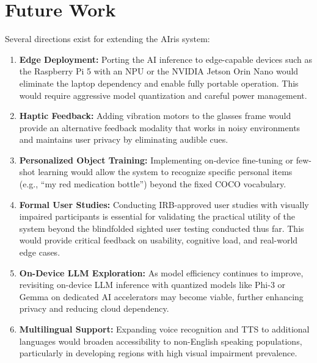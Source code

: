 \documentclass[12pt,a4paper]{report}
\begin{document}
\section{Future Work}

Several directions exist for extending the AIris system:

\begin{enumerate}
    \item \textbf{Edge Deployment:} Porting the AI inference to edge-capable devices such as the Raspberry Pi 5 with an NPU or the NVIDIA Jetson Orin Nano would eliminate the laptop dependency and enable fully portable operation. This would require aggressive model quantization and careful power management.

    \item \textbf{Haptic Feedback:} Adding vibration motors to the glasses frame would provide an alternative feedback modality that works in noisy environments and maintains user privacy by eliminating audible cues.

    \item \textbf{Personalized Object Training:} Implementing on-device fine-tuning or few-shot learning would allow the system to recognize specific personal items (e.g., ``my red medication bottle'') beyond the fixed COCO vocabulary.

    \item \textbf{Formal User Studies:} Conducting IRB-approved user studies with visually impaired participants is essential for validating the practical utility of the system beyond the blindfolded sighted user testing conducted thus far. This would provide critical feedback on usability, cognitive load, and real-world edge cases.

    \item \textbf{On-Device LLM Exploration:} As model efficiency continues to improve, revisiting on-device LLM inference with quantized models like Phi-3 or Gemma on dedicated AI accelerators may become viable, further enhancing privacy and reducing cloud dependency.

    \item \textbf{Multilingual Support:} Expanding voice recognition and TTS to additional languages would broaden accessibility to non-English speaking populations, particularly in developing regions with high visual impairment prevalence.
\end{enumerate}
\end{document}
